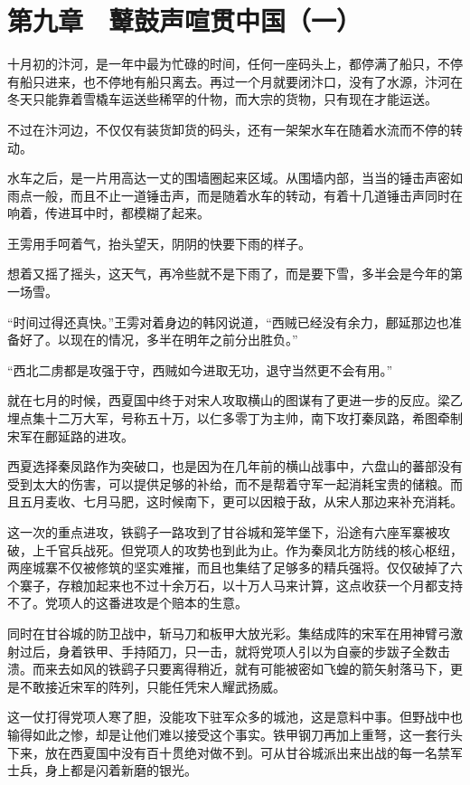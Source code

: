 \section{第九章　鼙鼓声喧贯中国（一）}

十月初的汴河，是一年中最为忙碌的时间，任何一座码头上，都停满了船只，不停有船只进来，也不停地有船只离去。再过一个月就要闭汴口，没有了水源，汴河在冬天只能靠着雪橇车运送些稀罕的什物，而大宗的货物，只有现在才能运送。

不过在汴河边，不仅仅有装货卸货的码头，还有一架架水车在随着水流而不停的转动。

水车之后，是一片用高达一丈的围墙圈起来区域。从围墙内部，当当的锤击声密如雨点一般，而且不止一道锤击声，而是随着水车的转动，有着十几道锤击声同时在响着，传进耳中时，都模糊了起来。

王雱用手呵着气，抬头望天，阴阴的快要下雨的样子。

想着又摇了摇头，这天气，再冷些就不是下雨了，而是要下雪，多半会是今年的第一场雪。

“时间过得还真快。”王雱对着身边的韩冈说道，“西贼已经没有余力，鄜延那边也准备好了。以现在的情况，多半在明年之前分出胜负。”

“西北二虏都是攻强于守，西贼如今进取无功，退守当然更不会有用。”

就在七月的时候，西夏国中终于对宋人攻取横山的图谋有了更进一步的反应。梁乙埋点集十二万大军，号称五十万，以仁多零丁为主帅，南下攻打秦凤路，希图牵制宋军在鄜延路的进攻。

西夏选择秦凤路作为突破口，也是因为在几年前的横山战事中，六盘山的蕃部没有受到太大的伤害，可以提供足够的补给，而不是帮着守军一起消耗宝贵的储粮。而且五月麦收、七月马肥，这时候南下，更可以因粮于敌，从宋人那边来补充消耗。

这一次的重点进攻，铁鹞子一路攻到了甘谷城和笼竿堡下，沿途有六座军寨被攻破，上千官兵战死。但党项人的攻势也到此为止。作为秦凤北方防线的核心枢纽，两座城寨不仅被修筑的坚实难摧，而且也集结了足够多的精兵强将。仅仅破掉了六个寨子，存粮加起来也不过十余万石，以十万人马来计算，这点收获一个月都支持不了。党项人的这番进攻是个赔本的生意。

同时在甘谷城的防卫战中，斩马刀和板甲大放光彩。集结成阵的宋军在用神臂弓激射过后，身着铁甲、手持陌刀，只一击，就将党项人引以为自豪的步跋子全数击溃。而来去如风的铁鹞子只要离得稍近，就有可能被密如飞蝗的箭矢射落马下，更是不敢接近宋军的阵列，只能任凭宋人耀武扬威。

这一仗打得党项人寒了胆，没能攻下驻军众多的城池，这是意料中事。但野战中也输得如此之惨，却是让他们难以接受这个事实。铁甲钢刀再加上重弩，这一套行头下来，放在西夏国中没有百十贯绝对做不到。可从甘谷城派出来出战的每一名禁军士兵，身上都是闪着新磨的银光。

